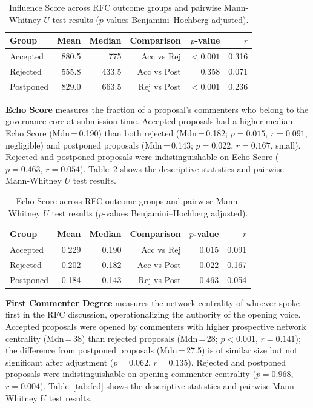 \documentclass[conference]{IEEEtran}
\begin{document}
\vspace{-10pt}
\begin{table}[h]
\centering
\caption{Influence Score across RFC outcome groups and pairwise Mann-Whitney $U$ test results ($p$-values Benjamini--Hochberg adjusted).}
\label{tab:inf}
\begin{tabular}{lrrrrr}
\toprule
\textbf{Group}
  & \textbf{Mean}
  & \textbf{Median}
  & \textbf{Comparison}
  & \textbf{$p$-value}
  & \textbf{$r$} \\
\midrule
Accepted  & 880.5 & 775
  & Acc vs Rej & ${<}0.001$ & 0.316 \\
Rejected  & 555.8 & 433.5
  & Acc vs Post & $0.358$ & 0.071 \\
Postponed & 829.0 & 663.5
  & Rej vs Post & ${<}0.001$ & 0.236 \\
\bottomrule
\end{tabular}
\end{table}

\textbf{Echo Score} measures the fraction of a proposal's commenters who belong to the governance core at submission time. Accepted proposals had a higher median Echo Score (Mdn\,=\,0.190) than both rejected (Mdn\,=\,0.182; $p = 0.015$, $r = 0.091$, negligible) and postponed proposals (Mdn\,=\,0.143; $p = 0.022$, $r = 0.167$, small). Rejected and postponed proposals were indistinguishable on Echo Score ($p = 0.463$, $r = 0.054$). Table~\ref{tab:echo} shows the descriptive statistics and pairwise Mann-Whitney $U$ test results.

\vspace{-10pt}
\begin{table}[h]
\centering
\caption{Echo Score across RFC outcome groups and pairwise Mann-Whitney $U$ test results ($p$-values Benjamini--Hochberg adjusted).}
\label{tab:echo}
\begin{tabular}{lrrrrr}
\toprule
\textbf{Group}
  & \textbf{Mean}
  & \textbf{Median}
  & \textbf{Comparison}
  & \textbf{$p$-value}
  & \textbf{$r$} \\
\midrule
Accepted  & 0.229 & 0.190
  & Acc vs Rej & $0.015$ & 0.091 \\
Rejected  & 0.202 & 0.182
  & Acc vs Post & $0.022$ & 0.167 \\
Postponed & 0.184 & 0.143
  & Rej vs Post & $0.463$ & 0.054 \\
\bottomrule
\end{tabular}
\end{table}

\textbf{First Commenter Degree} measures the network centrality of whoever spoke first in the RFC discussion, operationalizing the authority of the opening voice. Accepted proposals were opened by commenters with higher prospective network centrality (Mdn\,=\,38) than rejected proposals (Mdn\,=\,28; $p {<} 0.001$, $r = 0.141$); the difference from postponed proposals (Mdn\,=\,27.5) is of similar size but not significant after adjustment ($p = 0.062$, $r = 0.135$). Rejected and postponed proposals were indistinguishable on opening-commenter centrality ($p = 0.968$, $r = 0.004$). Table~\ref{tab:fcd} shows the descriptive statistics and pairwise Mann-Whitney $U$ test results.
\end{document}
